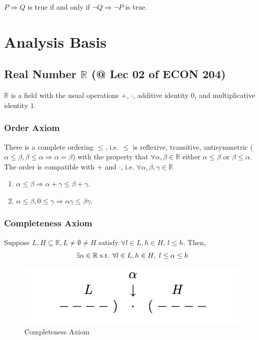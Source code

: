 \documentclass[11pt]{elegantbook}
\begin{document}
\begin{theorem}
\normalfont
$P \Rightarrow Q$ is true if and only if $\lnot Q \Rightarrow \lnot P$ is true.
\end{theorem}



\chapter{Analysis Basis}
\section{Real Number $\mathbb{R}$ \small{(@ Lec 02 of ECON 204)}}
$\mathbb{R}$ is a field with the usual operations $+$, $\cdot$, additive identity $0$, and multiplicative identity $1$.
\subsection{Order Axiom}
\begin{proposition}
    \normalfont
    There is a complete ordering $\leq$, i.e. $\leq$ is reflexive, transitive, antisymmetric ($\alpha\leq\beta,\beta\leq\alpha \Rightarrow \alpha=\beta$) with the property that $\forall \alpha,\beta\in \mathbb{R}$ either $\alpha\leq\beta$ or $\beta\leq \alpha$.\\
    The order is compatible with $+$ and $\cdot$, i.e. $\forall \alpha,\beta,\gamma\in \mathbb{R}$
    \begin{enumerate}
        \item $\alpha\leq\beta \Rightarrow \alpha+\gamma\leq\beta+\gamma$.
        \item $\alpha\leq\beta,0\leq\gamma \Rightarrow \alpha\gamma\leq\beta\gamma$.
    \end{enumerate}
\end{proposition}

\subsection{Completeness Axiom}
\begin{proposition}\label{Completeness Axiom}
    \normalfont
    Suppose $L,H\subseteq \mathbb{R},L\neq\emptyset\neq H$ satisfy $\forall l\in L, h\in H$, $l\leq h$. Then, $$\exists\alpha\in \mathbb{R} \textnormal{ s.t. }\forall l\in L, h\in H,\ l\leq\alpha\leq h$$
\end{proposition}
\begin{center}\begin{figure}[htbp]
    \centering
    \includegraphics[scale=0.25]{CA.png}
    \caption{Completeness Axiom}
    \label{}
\end{figure}\end{center}
\end{document}
